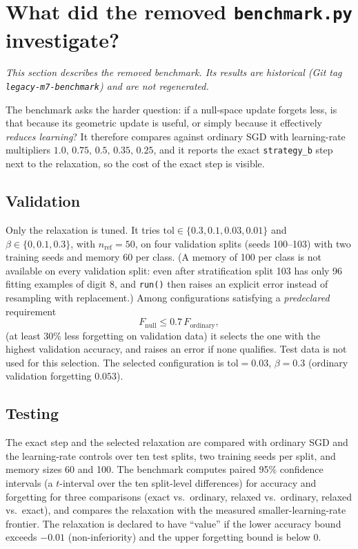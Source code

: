 \documentclass[11pt,a4paper]{article}
\newcommand{\code}[1]{\texttt{#1}}
\begin{document}
\section{What did the removed \texttt{benchmark.py} investigate?}\label{sec:benchmark}

\emph{This section describes the removed benchmark. Its results are historical (Git tag \code{legacy-m7-benchmark}) and are not regenerated.}

The benchmark asks the harder question: if a null-space update forgets less, is that because its geometric update is useful, or simply because it effectively \emph{reduces learning}? It therefore compares against ordinary SGD with learning-rate multipliers $1.0,\,0.75,\,0.5,\,0.35,\,0.25$, and it reports the exact \code{strategy\_b} step next to the relaxation, so the cost of the exact step is visible.

\subsection{Validation}

Only the relaxation is tuned. It tries $\text{tol}\in\{0.3,0.1,0.03,0.01\}$ and $\beta\in\{0,0.1,0.3\}$, with $n_{\text{ref}}=50$, on four validation splits (seeds 100--103) with two training seeds and memory 60 per class. (A memory of 100 per class is not available on every validation split: even after stratification split 103 has only 96 fitting examples of digit 8, and \code{run()} then raises an explicit error instead of resampling with replacement.) Among configurations satisfying a \emph{predeclared} requirement
\[
F_{\text{null}}\le0.7\,F_{\text{ordinary}},
\]
(at least 30\% less forgetting on validation data) it selects the one with the highest validation accuracy, and raises an error if none qualifies. Test data is not used for this selection. The selected configuration is $\text{tol}=0.03$, $\beta=0.3$ (ordinary validation forgetting $0.053$).

\subsection{Testing}

The exact step and the selected relaxation are compared with ordinary SGD and the learning-rate controls over ten test splits, two training seeds per split, and memory sizes 60 and 100. The benchmark computes paired 95\% confidence intervals (a $t$-interval over the ten split-level differences) for accuracy and forgetting for three comparisons (exact vs.\ ordinary, relaxed vs.\ ordinary, relaxed vs.\ exact), and compares the relaxation with the measured smaller-learning-rate frontier. The relaxation is declared to have ``value'' if the lower accuracy bound exceeds $-0.01$ (non-inferiority) and the upper forgetting bound is below 0.
\end{document}
